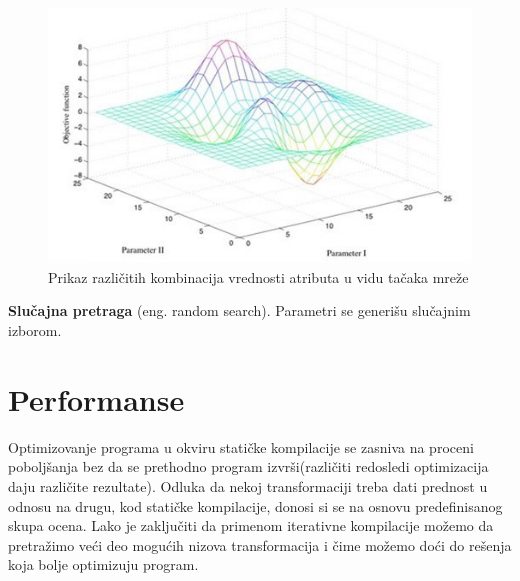 \documentclass[a4paper]{article}
\begin{document}
\begin{figure}[h]
\includegraphics[scale=0.75]{grid.png}
\caption{Prikaz različitih kombinacija vrednosti atributa u vidu tačaka mreže}
\label{fig:slika1}
\end{figure}

\textbf{Slučajna pretraga} (eng. random search). Parametri se generišu slučajnim izborom.

\section{Performanse}
\label{sec:performanse}
Optimizovanje programa u okviru statičke kompilacije se zasniva na proceni poboljšanja 
bez da se prethodno program izvrši(različiti redosledi optimizacija daju različite rezultate). 
Odluka da nekoj transformaciji treba dati prednost u odnosu na drugu, kod statičke kompilacije,
donosi si se na osnovu predefinisanog skupa ocena. Lako je zaključiti da primenom iterativne kompilacije 
možemo da pretražimo veći deo mogućih nizova transformacija i čime možemo doći do rešenja koja bolje optimizuju
program.
\end{document}
